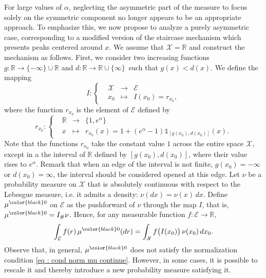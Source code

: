\documentclass[a4paper, 11pt]{article}
\theoremstyle{definition}
\newcommand{\modar}{\color{black}}
\newcommand{\indi}[1]{\mathds{1}_{#1}}
\begin{document}
{{For large values of $\alpha$, neglecting the asymmetric part of the measure to focus solely on the symmetric component no longer appears to be an appropriate approach. To emphasize this, we now propose to analyze a purely asymmetric case, corresponding to a modified version of the staircase mechanism which presents peaks centered around \( x \).
We assume that $\mathcal{X}=\mathbb{R}$ and construct the mechanism as follows.
First, we {\modar consider} two increasing functions $g : \mathbb{R} \to \{-\infty\} \cup \mathbb{R}$ and $d:  \mathbb{R} \to \mathbb{R} \cup \{\infty\}$ such that $g(x) < d(x)$. We define the mapping 
\begin{equation} 
	\label{eq : def I general}
	I: \left\{
	\begin{array}{llll} 
		&\mathcal{X} &\to& \mathcal{E} \\
&x_0 &\mapsto &I(x_0) = r_{x_0},
	\end{array}
	\right. 
\end{equation} 
where the function $r_{x_0}$ is the element of $\mathcal{E}$ defined by
\begin{equation}\label{eq : def r x0}
	r_{x_0} : \left\{
	\begin{array}{llll}
	&\mathbb{R} &\to & \{1,e^\alpha\}
	\\
	&x&\mapsto &r_{x_0}(x) = 1 + (e^\alpha - 1) \indi{[g(x_0), d(x_0)]}(x).
	\end{array}
		\right. 
\end{equation}
Note that the functions $r_{x_0}$ take the constant value \( 1 \) across the entire space $\mathcal{X}$, except in a the interval of $\mathbb{R}$ defined by $ [{g}(x_0), {d}(x_0)]$, where their value rises to $ e^\alpha $. Remark that when  an edge of the interval is not finite, $g(x_0)=-\infty$ or $d(x_0)=\infty$, the interval should be considered opened at this edge.   
Let $\nu$ be a probability measure on $\mathcal{X}$ that is absolutely continuous with respect to the Lebesgue measure, i.e. it admits a density: $\nu(dx) = \nu(x)\, dx$. Define $\mu^{\modar0}$ on $\mathcal{E}$ as the pushforward of $\nu$ through the map $I$, that is, $\mu^{\modar0} = I_\# \nu$. Hence, for any measurable function \( f: \mathcal{E} \to \mathbb{R} \),
\begin{equation}\label{eq: mu kernel}
	\int_{\mathcal{E}} f(r)\, \mu^{\modar0}(dr) = \int_\mathcal{X} f\big( I(x_0) \big)\, \nu(x_0)\, dx_0.
\end{equation}
Observe that, in general, $\mu^{\modar0}$ does not satisfy the normalization condition \eqref{eq : cond norm mu continue}. However, in some cases, it is possible to rescale it and thereby introduce a new probability measure satisfying it. %

}}
\end{document}
